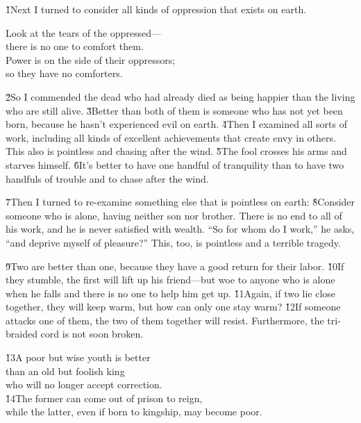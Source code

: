 \v{1}Next I turned to consider all kinds of oppression that exists on earth.

\begin{poetry}
\poeml Look at the tears of the oppressed--- \\
\poemll    there is no one to comfort them. \\
\poeml Power is on the side of their oppressors; \\
\poemll    so they have no comforters.
\end{poetry}

\v{2}So I commended the dead who had already died as being happier than the living who are still alive. \v{3}Better than both of them is someone who has not yet been born, because he hasn't experienced evil on earth. \v{4}Then I examined all sorts of work, including all kinds of excellent achievements that create envy in others. This also is pointless and chasing after the wind. \v{5}The fool crosses his arms and starves himself. \v{6}It's better to have one handful of tranquility than to have two handfuls of trouble and to chase after the wind.

\v{7}Then I turned to re-examine something else that is pointless on earth: \v{8}Consider someone who is alone, having neither son nor brother. There is no end to all of his work, and he is never satisfied with wealth. ``So for whom do I work,'' he asks, ``and deprive myself of pleasure?'' This, too, is pointless and a terrible tragedy.

\v{9}Two are better than one, because they have a good return for their labor. \v{10}If they stumble, the first will lift up his friend---but woe to anyone who is alone when he falls and there is no one to help him get up. \v{11}Again, if two lie close together, they will keep warm, but how can only one stay warm? \v{12}If someone attacks one of them, the two of them together will resist. Furthermore, the tri-braided cord is not soon broken.

\begin{poetry}
\poeml \v{13}A poor but wise youth is better \\
\poemll    than an old but foolish king \\
\poemlll       who will no longer accept correction. \\
\poeml \v{14}The former can come out of prison to reign, \\
\poemll    while the latter, even if born to kingship, may become poor.
\end{poetry}


